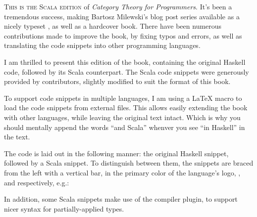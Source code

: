 
\lettrine[lhang=0.17]{T}{his is the Scala edition} of \emph{Category Theory for Programmers}.
It's been a tremendous success, making Bartosz Milewski's blog post series available as a nicely 
typeset , as well as a hardcover book. There have been numerous contributions made
to improve the book, by fixing typos and errors, as well as translating the code snippets into
other programming languages.

I am thrilled to present this edition of the book, containing the original Haskell code, followed by
its Scala counterpart. The Scala code snippets were generously provided by 
 contributors, slightly 
modified to suit the format of this book.

To support code snippets in multiple languages, I am using a \LaTeX{} macro to load the code snippets
from external files. This allows easily extending the book with other languages, while leaving the 
original text intact. Which is why you should mentally append the words ``and Scala'' whenver you see
``in Haskell'' in the text.

The code is laid out in the following manner: the original Haskell snippet, followed by a Scala snippet.
To distinguish between them, the snippets are braced from the left with a vertical bar, in the primary
color of the language's logo, , 
and  respectively, e.g.:

\unskip
{}
\NoIndentAfterThis

In addition, some Scala snippets make use of the 
 compiler plugin, to support nicer syntax for partially-applied types.